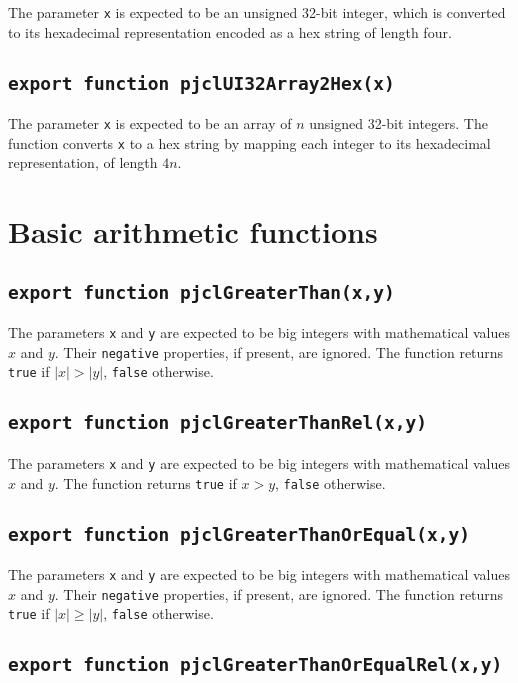 \documentclass[12pt]{article}
\begin{document}
The parameter {\tt x} is expected to be an unsigned 32-bit integer, which is
converted to its hexadecimal representation encoded as a hex string of length four.

\subsection{\tt export function pjclUI32Array2Hex(x)}

The parameter {\tt x} is expected to be an array of $n$
unsigned 32-bit integers.  The function converts {\tt x} to a hex string by mapping
each integer to its hexadecimal representation, of length $4n$.

\section{Basic arithmetic functions}

\subsection{\tt export function pjclGreaterThan(x,y)}

The parameters {\tt x} and {\tt y} are expected to be big integers
with mathematical values $x$ and $y$.  Their {\tt negative}
properties, if present, are ignored.  The function returns {\tt true}
if $|x| > |y|$, {\tt false} otherwise.

\subsection{\tt export function pjclGreaterThanRel(x,y)}

The parameters {\tt x} and {\tt y} are expected to be big integers
with mathematical values $x$ and $y$.  The function returns {\tt true}
if $x > y$, {\tt false} otherwise.

\subsection{\tt export function pjclGreaterThanOrEqual(x,y)}

The parameters {\tt x} and {\tt y} are expected to be big integers
with mathematical values $x$ and $y$.  Their {\tt negative}
properties, if present, are ignored.  The function returns {\tt true}
if $|x| \geq |y|$, {\tt false} otherwise.

\subsection{\tt export function pjclGreaterThanOrEqualRel(x,y)}
\end{document}
